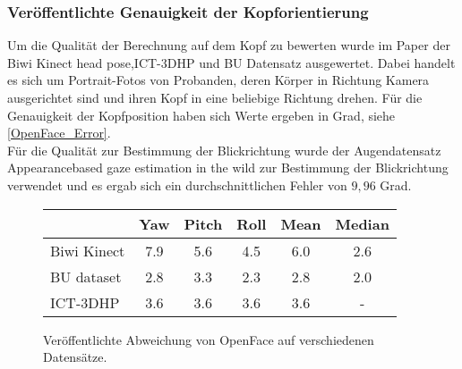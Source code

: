 \subsubsection{Veröffentlichte Genauigkeit der Kopforientierung}
Um die Qualität der Berechnung auf dem Kopf zu bewerten wurde im Paper \cite{OpenFace} der \glqq Biwi Kinect head pose\grqq \cite{BIWI_database},\glqq ICT-3DHP\grqq \cite{ICT_database} und \glqq BU Datensatz\grqq \cite{BU_database} ausgewertet. Dabei handelt es sich um Portrait-Fotos von Probanden, deren Körper in Richtung Kamera ausgerichtet sind und ihren Kopf in eine beliebige Richtung drehen. Für die Genauigkeit der Kopfposition haben sich Werte ergeben in Grad, siehe \autoref{OpenFace_Error}.\\
Für die Qualität zur Bestimmung der Blickrichtung wurde der Augendatensatz \glqq Appearancebased gaze estimation in the wild\grqq \cite{database_Eye_old} zur Bestimmung der Blickrichtung verwendet und es ergab sich ein durchschnittlichen Fehler von $9,96$ Grad.
\begin{figure}[h]
	\centering
	\begin{tabular}{|l|c|c|c||c|c|}
		\hline
		&Yaw&Pitch&Roll&Mean&Median\\\hline
		Biwi Kinect&7.9&5.6&4.5&6.0&2.6\\\hline
		BU dataset&2.8&3.3&2.3&2.8&2.0\\\hline
		ICT-3DHP&3.6&3.6&3.6&3.6&-\\\hline
	\end{tabular}
	\caption{Veröffentlichte Abweichung von OpenFace auf verschiedenen Datensätze.\cite{OpenFace}}
	\label{OpenFace_Error}
\end{figure}